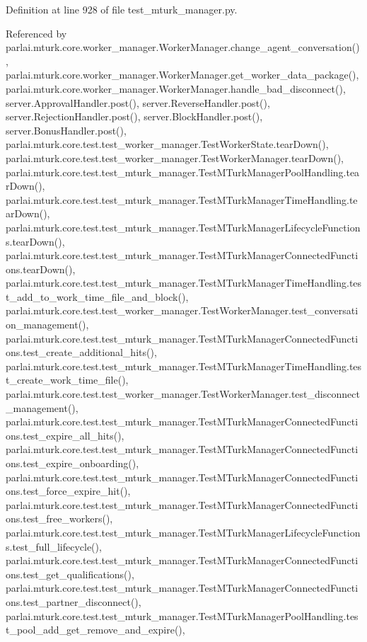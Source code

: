 Definition at line 928 of file test\+\_\+mturk\+\_\+manager.\+py.



Referenced by parlai.\+mturk.\+core.\+worker\+\_\+manager.\+Worker\+Manager.\+change\+\_\+agent\+\_\+conversation(), parlai.\+mturk.\+core.\+worker\+\_\+manager.\+Worker\+Manager.\+get\+\_\+worker\+\_\+data\+\_\+package(), parlai.\+mturk.\+core.\+worker\+\_\+manager.\+Worker\+Manager.\+handle\+\_\+bad\+\_\+disconnect(), server.\+Approval\+Handler.\+post(), server.\+Reverse\+Handler.\+post(), server.\+Rejection\+Handler.\+post(), server.\+Block\+Handler.\+post(), server.\+Bonus\+Handler.\+post(), parlai.\+mturk.\+core.\+test.\+test\+\_\+worker\+\_\+manager.\+Test\+Worker\+State.\+tear\+Down(), parlai.\+mturk.\+core.\+test.\+test\+\_\+worker\+\_\+manager.\+Test\+Worker\+Manager.\+tear\+Down(), parlai.\+mturk.\+core.\+test.\+test\+\_\+mturk\+\_\+manager.\+Test\+M\+Turk\+Manager\+Pool\+Handling.\+tear\+Down(), parlai.\+mturk.\+core.\+test.\+test\+\_\+mturk\+\_\+manager.\+Test\+M\+Turk\+Manager\+Time\+Handling.\+tear\+Down(), parlai.\+mturk.\+core.\+test.\+test\+\_\+mturk\+\_\+manager.\+Test\+M\+Turk\+Manager\+Lifecycle\+Functions.\+tear\+Down(), parlai.\+mturk.\+core.\+test.\+test\+\_\+mturk\+\_\+manager.\+Test\+M\+Turk\+Manager\+Connected\+Functions.\+tear\+Down(), parlai.\+mturk.\+core.\+test.\+test\+\_\+mturk\+\_\+manager.\+Test\+M\+Turk\+Manager\+Time\+Handling.\+test\+\_\+add\+\_\+to\+\_\+work\+\_\+time\+\_\+file\+\_\+and\+\_\+block(), parlai.\+mturk.\+core.\+test.\+test\+\_\+worker\+\_\+manager.\+Test\+Worker\+Manager.\+test\+\_\+conversation\+\_\+management(), parlai.\+mturk.\+core.\+test.\+test\+\_\+mturk\+\_\+manager.\+Test\+M\+Turk\+Manager\+Connected\+Functions.\+test\+\_\+create\+\_\+additional\+\_\+hits(), parlai.\+mturk.\+core.\+test.\+test\+\_\+mturk\+\_\+manager.\+Test\+M\+Turk\+Manager\+Time\+Handling.\+test\+\_\+create\+\_\+work\+\_\+time\+\_\+file(), parlai.\+mturk.\+core.\+test.\+test\+\_\+worker\+\_\+manager.\+Test\+Worker\+Manager.\+test\+\_\+disconnect\+\_\+management(), parlai.\+mturk.\+core.\+test.\+test\+\_\+mturk\+\_\+manager.\+Test\+M\+Turk\+Manager\+Connected\+Functions.\+test\+\_\+expire\+\_\+all\+\_\+hits(), parlai.\+mturk.\+core.\+test.\+test\+\_\+mturk\+\_\+manager.\+Test\+M\+Turk\+Manager\+Connected\+Functions.\+test\+\_\+expire\+\_\+onboarding(), parlai.\+mturk.\+core.\+test.\+test\+\_\+mturk\+\_\+manager.\+Test\+M\+Turk\+Manager\+Connected\+Functions.\+test\+\_\+force\+\_\+expire\+\_\+hit(), parlai.\+mturk.\+core.\+test.\+test\+\_\+mturk\+\_\+manager.\+Test\+M\+Turk\+Manager\+Connected\+Functions.\+test\+\_\+free\+\_\+workers(), parlai.\+mturk.\+core.\+test.\+test\+\_\+mturk\+\_\+manager.\+Test\+M\+Turk\+Manager\+Lifecycle\+Functions.\+test\+\_\+full\+\_\+lifecycle(), parlai.\+mturk.\+core.\+test.\+test\+\_\+mturk\+\_\+manager.\+Test\+M\+Turk\+Manager\+Connected\+Functions.\+test\+\_\+get\+\_\+qualifications(), parlai.\+mturk.\+core.\+test.\+test\+\_\+mturk\+\_\+manager.\+Test\+M\+Turk\+Manager\+Connected\+Functions.\+test\+\_\+partner\+\_\+disconnect(), parlai.\+mturk.\+core.\+test.\+test\+\_\+mturk\+\_\+manager.\+Test\+M\+Turk\+Manager\+Pool\+Handling.\+test\+\_\+pool\+\_\+add\+\_\+get\+\_\+remove\+\_\+and\+\_\+expire(), 